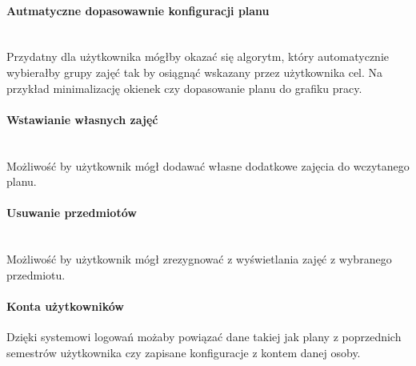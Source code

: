 \documentclass{mwart}
\newcommand{\paragraphnl}[1]{\paragraph{#1} \mbox{} \\} %
\begin{document}
\paragraphnl{Autmatyczne dopasowawnie konfiguracji planu}
Przydatny dla użytkownika mógłby okazać się algorytm, który automatycznie wybierałby grupy zajęć tak by osiągnąć wskazany przez użytkownika cel. Na przykład minimalizację okienek czy dopasowanie planu do grafiku pracy.

\paragraphnl{Wstawianie własnych zajęć}
Możliwość by użytkownik mógł dodawać własne dodatkowe zajęcia do wczytanego planu.

\paragraphnl{Usuwanie przedmiotów}
Możliwość by użytkownik mógł zrezygnować z wyświetlania zajęć z wybranego przedmiotu.

\paragraph{Konta użytkowników}
Dzięki systemowi logowań możaby powiązać dane takiej jak plany z poprzednich semestrów użytkownika czy zapisane konfiguracje z kontem danej osoby.
\end{document}
